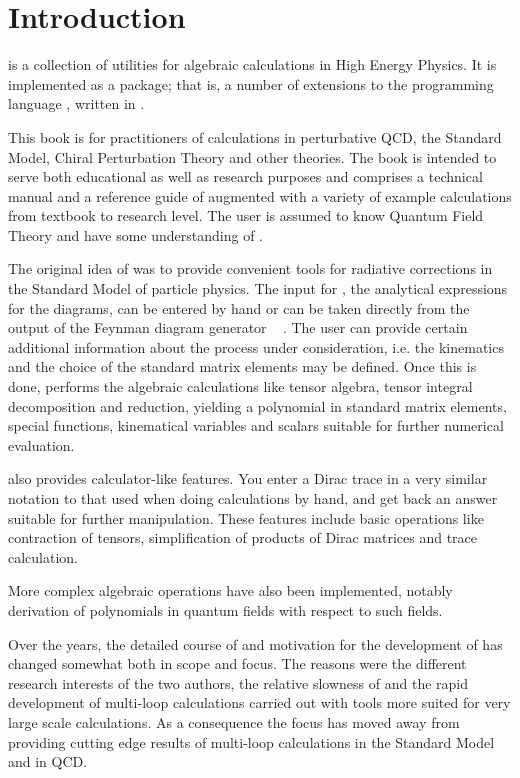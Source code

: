 \section{Introduction}
\label{intro}

\fc is a collection of utilities for algebraic calculations in 
High Energy Physics. It is implemented as a \mma package; that is,
a number of extensions to the programming language \mma,
written in \mma. 

This book is for practitioners of calculations in perturbative QCD,
the Standard Model, Chiral Perturbation Theory and other theories.
The book is intended to serve both educational as well as research purposes
and comprises a technical manual and a reference guide of \fc
augmented with a variety of example calculations from textbook to research level.
The user is assumed to know Quantum Field Theory and have some understanding of \mma.

The original idea of \fc was to provide convenient tools 
for radiative corrections in the Standard Model of particle physics. 
The input for \fc, the analytical expressions for the diagrams, can be 
entered by hand or can be taken directly from the output of the Feynman diagram generator \fa\ \cite{feynarts} .
The user can provide certain additional  information about the process 
under consideration, i.e. the kinematics and the choice of the standard 
matrix elements may be defined. Once this is done, \fc performs the 
algebraic calculations like tensor algebra, tensor integral decomposition and reduction,
yielding a polynomial in standard matrix elements,  special functions, kinematical 
variables and scalars suitable for further numerical evaluation.

\fc also provides calculator-like features. You enter a Dirac trace 
in a very similar notation to that used when doing calculations by hand, and 
get back an answer suitable 
for further manipulation. These features include basic operations like contraction of
tensors, simplification of products of Dirac matrices and trace calculation.

More complex algebraic operations have also been implemented, notably derivation
of polynomials in quantum fields with respect to such fields.

Over the years, the detailed course of and motivation for the development of \fc has
changed somewhat both in scope and focus. The reasons were  the different research
interests of the two authors, the relative slowness of \mma and the rapid development of
multi-loop calculations carried out with tools \cite{form, formcalc} more suited 
for very large scale calculations.
As a consequence the focus has moved away from providing cutting edge results of multi-loop calculations
in the Standard Model and in QCD. 

